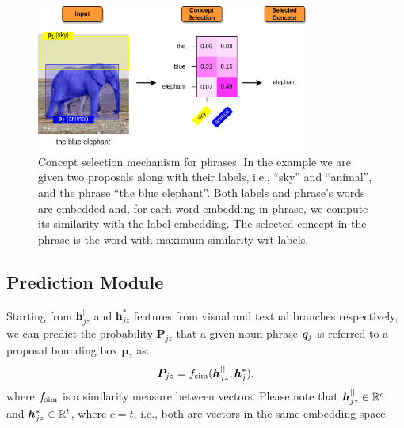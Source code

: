 \begin{figure}
  \centering
  \includegraphics[width=0.8\textwidth]{figures/concept-selection-example.png}
  \caption[Concept selection mechanism for phrases]{Concept selection
  mechanism for phrases. In the example we are given two proposals
  along with their labels, i.e., ``sky'' and ``animal'', and the
  phrase ``the blue elephant''. Both labels and phrase's words are
  embedded and, for each word embedding in phrase, we compute its
  similarity with the label embedding. The selected concept in the
  phrase is the word with maximum similarity wrt labels. }
  \label{fig:concept-selection-example}
\end{figure}

\subsection{Prediction Module}
\label{subsec:prediction-module}

Starting from $\bm{h}^{||}_{jz}$ and $\bm{h}^*_{jz}$ features from
visual and textual branches respectively, we can predict the
probability $\bm{P}_{jz}$ that a given noun phrase $\bm{q}_j$ is referred
to a proposal bounding box $\bm{p}_z$ as:
\begin{equation}
  \bm{P}_{jz} = f_{\text{sim}} ( \bm{h}^{||}_{jz} , \bm{h}^*_j ),
\end{equation}
where $f_{\text{sim}}$ is a similarity measure between vectors. Please note
that $\bm{h}^{||}_{jz} \in \mathbb{R}^c$ and $\bm{h}^*_{jz} \in \mathbb{R}^t$,
where $c = t$, i.e., both are vectors in the same embedding space.

